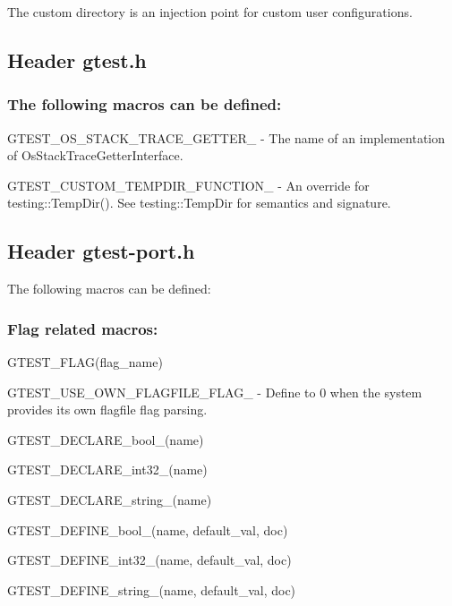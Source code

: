 The custom directory is an injection point for custom user configurations.

\subsection*{Header {\ttfamily gtest.\+h}}

\subsubsection*{The following macros can be defined\+:}


\begin{DoxyItemize}
\item {\ttfamily G\+T\+E\+S\+T\+\_\+\+O\+S\+\_\+\+S\+T\+A\+C\+K\+\_\+\+T\+R\+A\+C\+E\+\_\+\+G\+E\+T\+T\+E\+R\+\_\+} -\/ The name of an implementation of {\ttfamily Os\+Stack\+Trace\+Getter\+Interface}.
\item {\ttfamily G\+T\+E\+S\+T\+\_\+\+C\+U\+S\+T\+O\+M\+\_\+\+T\+E\+M\+P\+D\+I\+R\+\_\+\+F\+U\+N\+C\+T\+I\+O\+N\+\_\+} -\/ An override for {\ttfamily testing\+::\+Temp\+Dir()}. See {\ttfamily testing\+::\+Temp\+Dir} for semantics and signature.
\end{DoxyItemize}

\subsection*{Header {\ttfamily gtest-\/port.\+h}}

The following macros can be defined\+:

\subsubsection*{Flag related macros\+:}


\begin{DoxyItemize}
\item {\ttfamily G\+T\+E\+S\+T\+\_\+\+F\+L\+A\+G(flag\+\_\+name)}
\item {\ttfamily G\+T\+E\+S\+T\+\_\+\+U\+S\+E\+\_\+\+O\+W\+N\+\_\+\+F\+L\+A\+G\+F\+I\+L\+E\+\_\+\+F\+L\+A\+G\+\_\+} -\/ Define to 0 when the system provides its own flagfile flag parsing.
\item {\ttfamily G\+T\+E\+S\+T\+\_\+\+D\+E\+C\+L\+A\+R\+E\+\_\+bool\+\_\+(name)}
\item {\ttfamily G\+T\+E\+S\+T\+\_\+\+D\+E\+C\+L\+A\+R\+E\+\_\+int32\+\_\+(name)}
\item {\ttfamily G\+T\+E\+S\+T\+\_\+\+D\+E\+C\+L\+A\+R\+E\+\_\+string\+\_\+(name)}
\item {\ttfamily G\+T\+E\+S\+T\+\_\+\+D\+E\+F\+I\+N\+E\+\_\+bool\+\_\+(name, default\+\_\+val, doc)}
\item {\ttfamily G\+T\+E\+S\+T\+\_\+\+D\+E\+F\+I\+N\+E\+\_\+int32\+\_\+(name, default\+\_\+val, doc)}
\item {\ttfamily G\+T\+E\+S\+T\+\_\+\+D\+E\+F\+I\+N\+E\+\_\+string\+\_\+(name, default\+\_\+val, doc)}
\end{DoxyItemize}

